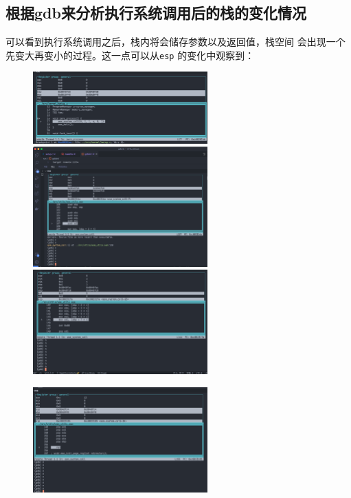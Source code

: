\subsection{根据gdb来分析执行系统调用后的栈的变化情况}
可以看到执行系统调用之后，栈内将会储存参数以及返回值，栈空间
会出现一个先变大再变小的过程。这一点可以从\texttt{esp}
的变化中观察到：

\begin{figure}[H]
    \centering
    \includegraphics[width=0.6\textwidth]{figures/espStart.png}
    \includegraphics[width=0.6\textwidth]{figures/espMiddle.png}
    \includegraphics[width=0.6\textwidth]{figures/espMiddle2.png}
    \label{esp}
\end{figure}
\begin{figure}[H]
    \centering
    \includegraphics[width=0.6\textwidth]{figures/espEnd.png}
    \label{esp2}
\end{figure}

